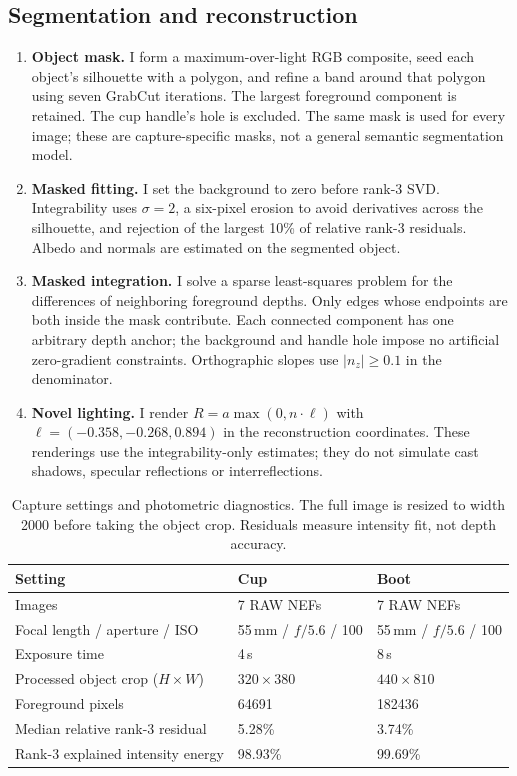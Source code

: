 \documentclass[11pt]{article}
\begin{document}
\subsection*{Segmentation and reconstruction}
\begin{enumerate}\setlength{\itemsep}{2pt}
\item \textbf{Object mask.} I form a maximum-over-light RGB composite, seed each object's silhouette with a polygon, and refine a band around that polygon using seven GrabCut iterations. The largest foreground component is retained. The cup handle's hole is excluded. The same mask is used for every image; these are capture-specific masks, not a general semantic segmentation model.
\item \textbf{Masked fitting.} I set the background to zero before rank-3 SVD. Integrability uses $\sigma=2$, a six-pixel erosion to avoid derivatives across the silhouette, and rejection of the largest 10\% of relative rank-3 residuals. Albedo and normals are estimated on the segmented object.
\item \textbf{Masked integration.} I solve a sparse least-squares problem for the differences of neighboring foreground depths. Only edges whose endpoints are both inside the mask contribute. Each connected component has one arbitrary depth anchor; the background and handle hole impose no artificial zero-gradient constraints. Orthographic slopes use $|n_z|\geq0.1$ in the denominator.
\item \textbf{Novel lighting.} I render $R=a\max(0,n\cdot\ell)$ with $\ell=(-0.358,-0.268,0.894)$ in the reconstruction coordinates. These renderings use the integrability-only estimates; they do not simulate cast shadows, specular reflections or interreflections.
\end{enumerate}
\begin{table}[H]\centering\small
\begin{tabular}{lll}\toprule
Setting & Cup & Boot \\\midrule
Images & 7 RAW NEFs & 7 RAW NEFs \\
Focal length / aperture / ISO & 55\,mm / $f/5.6$ / 100 & 55\,mm / $f/5.6$ / 100 \\
Exposure time & 4\,s & 8\,s \\
Processed object crop ($H\times W$) & $320\times380$ & $440\times810$ \\
Foreground pixels & 64691 & 182436 \\
Median relative rank-3 residual & 5.28\% & 3.74\% \\
Rank-3 explained intensity energy & 98.93\% & 99.69\% \\\bottomrule
\end{tabular}\caption{Capture settings and photometric diagnostics. The full image is resized to width 2000 before taking the object crop. Residuals measure intensity fit, not depth accuracy.}\label{tab:capture}\end{table}
\end{document}
